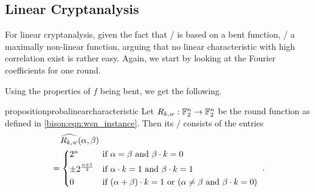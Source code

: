\subsection{Linear Cryptanalysis}
For linear cryptanalysis, given the fact that \bison/ is based on a bent function, \ie/ a maximally non-linear function, arguing that no linear characteristic with high correlation exist is rather easy.
Again, we start by looking at the Fourier coefficients for one round.

Using the properties of $f$ being bent, we get the following.
\begin{restatable}{proposition}{probalinearcharacteristic}\label{prop:bison:lat}
    Let $R_{k,w} : \mathbb{F}_2^n \to \mathbb{F}_2^n$ be the round function as defined in \cref{bison:eqn:wsn_instance}.
    Then its \LAT/ consists of the entries
    \begin{align}\label{bison:eqn:fc_round}
        &\hphantom{=}\ \widehat{R_{k,w}}(\alpha,\beta) \nonumber \\
        &= \begin{cases*}
            2^n                    & if $\alpha = \beta$ and $\iprod{\beta}{k} = 0$ \\
            \pm2^{\frac{n+1}{2}} & if $\iprod{\alpha}{k} = 1$ and $\iprod{\beta}{k} = 1$ \\
            0                      & if $\iprod{(\alpha + \beta)}{k} = 1$ or $(\alpha \neq \beta$ and $\iprod{\beta}{k} = 0)$
        \end{cases*}.
    \end{align}
\end{restatable}
